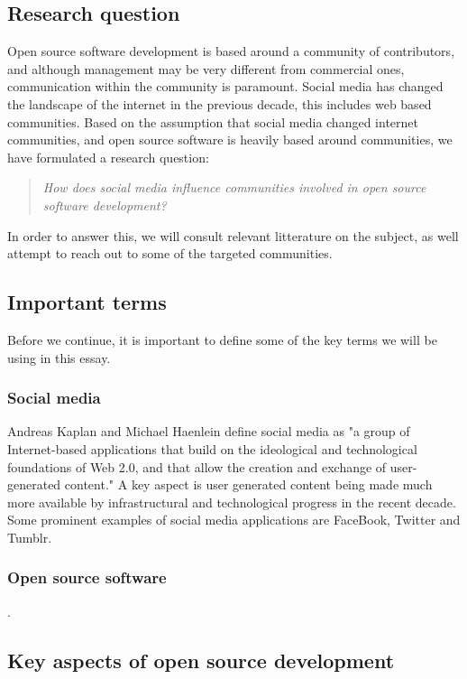 \documentclass[a4paper,11pt]{article} %
\begin{document}
\subsection{Research question}

Open source software development is based around a community of
contributors, and although management may be very different from commercial
ones, communication within the community is paramount.  Social media has
changed the landscape of the internet in the previous
decade\cite{Kaplan201059}, this includes web based communities. Based on the
assumption that social media changed internet communities, and open source
software is heavily based around communities, we have formulated a research
question:
\begin{quote}
  \textit{How does social media influence communities involved in open source
    software development?}
\end{quote}

In order to answer this, we will consult relevant litterature on the
subject, as well attempt to reach out to some of the targeted communities.

\subsection{Important terms}
Before we continue, it is important to define some of the key terms we will
be using in this essay.
\subsubsection*{Social media}
Andreas Kaplan and Michael Haenlein define social media as "a group of
Internet-based applications that build on the ideological and technological
foundations of Web 2.0, and that allow the creation and exchange of
user-generated content."\cite{Kaplan201059} A key aspect is user generated
content being made much more available by infrastructural and technological
progress in the recent decade. Some prominent examples of social media
applications are FaceBook, Twitter and Tumblr.
\subsubsection*{Open source software}
\cite{leister2014opensource}.

\subsection{Key aspects of open source development}
\end{document}
